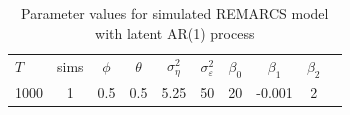 \begin{table}[H]
\centering\begin{tabular}{lccccccccc}
\hline
$T$ & sims & $\phi$ & $\theta$ & $\sigma_\eta^2$ & $\sigma_\varepsilon^2$ & $\beta_0$ & $\beta_1$ & $\beta_2$ \\
1000 & 1 & 0.5 & 0.5 & 5.25 & 50 & 20 & -0.001 & 2 \\
\hline
\end{tabular}
\caption{Parameter values for simulated REMARCS model with latent AR(1) process }
\label{tab:param_values_mab}
\end{table}

